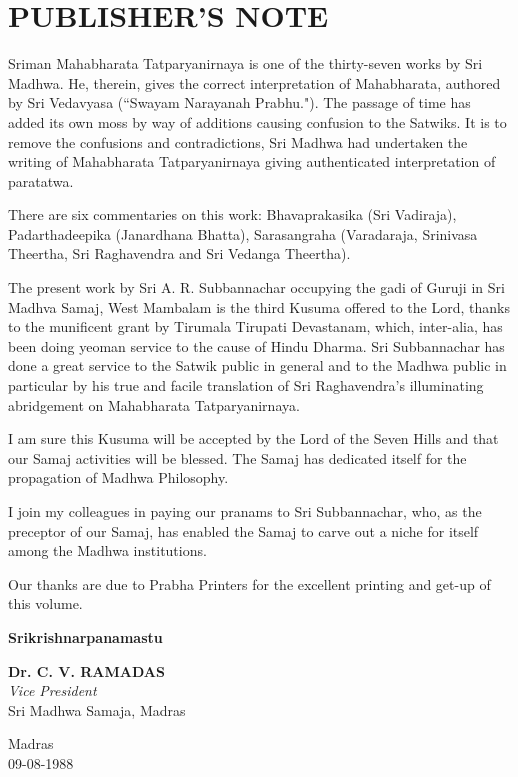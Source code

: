 
\chapter*{PUBLISHER'S NOTE}

Sriman Mahabharata Tatparyanirnaya is one of the thirty-seven works by Sri Madhwa. He, therein, gives the correct interpretation of Mahabharata, authored by Sri Vedavyasa (“Swayam Narayanah Prabhu."). The passage of time has added its own moss by way of additions causing confusion to the Satwiks. It is to remove the confusions and contradictions, Sri Madhwa had undertaken the writing of Mahabharata Tatparyanirnaya giving authenticated interpretation of paratatwa.

There are six commentaries on this work: Bhavaprakasika (Sri Vadiraja), Padarthadeepika (Janardhana Bhatta), Sarasangraha (Varadaraja, Srinivasa Theertha, Sri Raghavendra and Sri Vedanga Theertha).

The present work by Sri A. R. Subbannachar occupying the gadi of Guruji in Sri Madhva Samaj, West Mambalam is the third Kusuma offered to the Lord, thanks to the munificent grant by Tirumala Tirupati Devastanam, which, inter-alia, has been doing yeoman service to the cause of Hindu Dharma. Sri Subbannachar has done a great service to the Satwik public in general and to the Madhwa public in particular by his true and facile translation of Sri Raghavendra's illuminating abridgement on Mahabharata Tatparyanirnaya.

\newpage

I am sure this Kusuma will be accepted by the Lord of the Seven Hills and that our Samaj activities will be blessed. The Samaj has dedicated itself for the propagation of Madhwa Philosophy.

I join my colleagues in paying our pranams to Sri Subbannachar, who, as the preceptor of our Samaj, has enabled the Samaj to carve out a niche for itself among the Madhwa institutions.

Our thanks are due to Prabha Printers for the excellent printing and get-up of this volume.

\begin{center}
\textbf{Srikrishnarpanamastu}
\end{center}

\begin{flushright}
\textbf{Dr. C. V. RAMADAS}\\\textit{Vice President}\\ Sri Madhwa Samaja, Madras
\end{flushright}

\begin{flushleft}
Madras \\ 09-08-1988
\end{flushleft}

